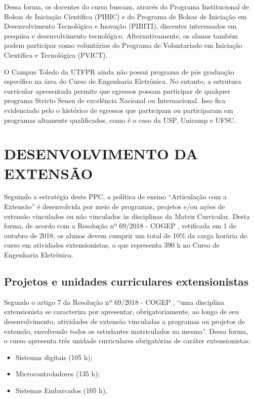 Dessa forma, os docentes do curso buscam, através do Programa Institucional de Bolsas de Iniciação Científica (PIBIC) e do Programa de Bolsas de Iniciação em Desenvolvimento Tecnológico e Inovação (PIBITI), discentes interessados em pesquisa e desenvolvimento tecnológico. Alternativamente, os alunos também podem participar como voluntários do Programa de Voluntariado em Iniciação Científica e Tecnológica (PVICT).

O Campus Toledo da UTFPR ainda não possui programa de pós graduação específico na área do Curso de Engenharia Eletrônica. No entanto, a estrutura curricular apresentada permite que egressos possam participar de qualquer programa Stricto Sensu de excelência Nacional ou Internacional. Isso fica evidenciado pelo o histórico de egressos que participam ou participaram em programas altamente qualificados, como é o caso da USP, Unicamp e UFSC.

\section{DESENVOLVIMENTO DA EXTENSÃO}

Seguindo a estratégia deste PPC, a política de ensino ``Articulação com a Extensão'' é desenvolvida por meio de programas, projetos e/ou ações de extensão vinculados ou não vinculados às disciplinas da Matriz Curricular. Desta forma, de acordo com a Resolução nº 69/2018 - COGEP \cite{cogep69}, retificada em 1\textordmasculine{} de outubro de 2018, os alunos devem cumprir um total de 10\% da carga horária do curso em atividades extensionistas, o que representa 390 h no Curso de Engenharia Eletrônica.

\subsection{Projetos e unidades curriculares extensionistas}

Segundo o artigo 7\textordmasculine{} da Resolução nº 69/2018 - COGEP \cite{cogep69}, ``uma disciplina extensionista se caracteriza por apresentar, obrigatoriamente, ao longo de seu desenvolvimento, atividades de extensão vinculadas a programas ou projetos de extensão, envolvendo todos os estudantes matriculados na mesma''. Dessa forma, o curso apresenta três unidade curriculares obrigatórias de caráter extensionistas:

\begin{itemize}
    \item Sistemas digitais (105 h);
    \item Microcontroladores (135 h);
    \item Sistemas Embarcados (105 h),
\end{itemize}

